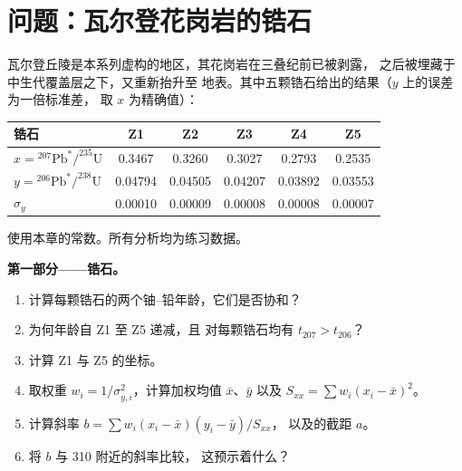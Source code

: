 \section{问题：瓦尔登花岗岩的锆石}

\begin{problem}\label{pb:b3:advanced-geochronology:1}
瓦尔登丘陵是本系列虚构的地区，其花岗岩在三叠纪前已被剥露，
之后被埋藏于中生代覆盖层之下，又重新抬升至
地表。其中五颗锆石给出的结果（$y$ 上的误差为一倍标准差，
取 $x$ 为精确值）：
\begin{center}
\small
\begin{tabular}{|l|ccccc|}
\hline
锆石 & Z1 & Z2 & Z3 & Z4 & Z5 \\
\hline
$x = {}^{207}\mathrm{Pb}^*/^{235}\mathrm U$ & 0.3467 & 0.3260 & 0.3027 & 0.2793 & 0.2535 \\
$y = {}^{206}\mathrm{Pb}^*/^{238}\mathrm U$ & 0.04794 & 0.04505 & 0.04207 & 0.03892 & 0.03553 \\
$\sigma_y$ & 0.00010 & 0.00009 & 0.00008 & 0.00008 & 0.00007 \\
\hline
\end{tabular}
\end{center}
使用本章的常数。所有分析均为练习数据。

\medskip\noindent\textbf{第一部分——锆石。}
\begin{enumerate}
\item 计算每颗锆石的两个铀–铅年龄，它们是否协和？
\item 为何年龄自 Z1 至 Z5 递减，且
对每颗锆石均有 $t_{207} > t_{206}$？
\item 计算 Z1 与 Z5 的坐标。
\item 取权重 $w_i = 1/\sigma_{y,i}^2$，计算加权均值
$\bar x$、$\bar y$ 以及 $S_{xx} = \sum w_i(x_i - \bar x)^2$。
\item 计算斜率 $b = \sum w_i(x_i - \bar x)(y_i - \bar y)/S_{xx}$，
以及的截距 $a$。
\item 将 $b$ 与 \qty{310}{\Ma} 附近的斜率比较，
这预示着什么？
\end{enumerate}


\end{problem}
